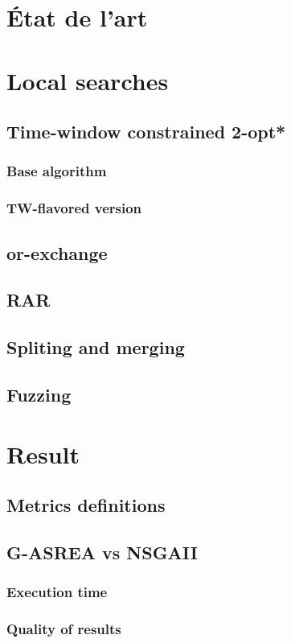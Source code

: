 \documentclass[11pt]{memoir}
\begin{document}
\section{État de l'art}
\section{Local searches}
\subsection{Time-window constrained 2-opt*}
\subsubsection{Base algorithm}
\subsubsection{TW-flavored version}
\subsection{or-exchange}
\subsection{RAR}
\subsection{Spliting and merging}
\subsection{Fuzzing}

\section{Result}
\subsection{Metrics definitions}

\subsection{G-ASREA vs NSGAII}
\subsubsection{Execution time}
\subsubsection{Quality of results}
\end{document}
